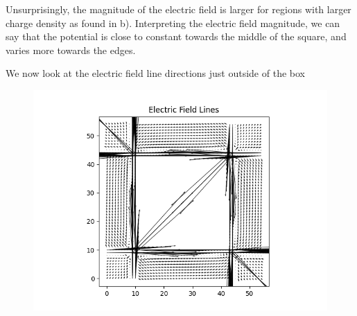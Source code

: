 \documentclass[]{article}
\begin{document}
Unsurprisingly, the magnitude of the electric field is larger for regions with larger charge density as found in b). Interpreting the electric field magnitude, we can say that the potential is close to constant towards the middle of the square, and varies more towards the edges.

We now look at the electric field line directions just outside of the box

\begin{figure}[h!]
	\centering
	\includegraphics[width=0.5\linewidth]{../Results/2c3.png}
\end{figure}
\end{document}
